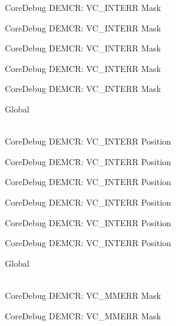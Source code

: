 \begin{DoxyRefList}
\label{deprecated__deprecated000202}%
%
Core\+Debug DEMCR\+: VC\+\_\+\+INTERR Mask 

\label{deprecated__deprecated000344}%
%
Core\+Debug DEMCR\+: VC\+\_\+\+INTERR Mask 

\label{deprecated__deprecated000420}%
%
Core\+Debug DEMCR\+: VC\+\_\+\+INTERR Mask 

\label{deprecated__deprecated000509}%
%
Core\+Debug DEMCR\+: VC\+\_\+\+INTERR Mask 

\label{deprecated__deprecated000611}%
%
Core\+Debug DEMCR\+: VC\+\_\+\+INTERR Mask  
\item[{\parbox[t]{\linewidth}{Global \doxylink{group___c_m_s_i_s___core_debug_ga22079a6e436f23b90308be97e19cf07e}{Core\+Debug\+\_\+\+DEMCR\+\_\+\+VC\+\_\+\+INTERR\+\_\+\+Pos} }}]\hfill \\
\label{deprecated__deprecated000057}%
%
Core\+Debug DEMCR\+: VC\+\_\+\+INTERR Position 

\label{deprecated__deprecated000201}%
%
Core\+Debug DEMCR\+: VC\+\_\+\+INTERR Position 

\label{deprecated__deprecated000343}%
%
Core\+Debug DEMCR\+: VC\+\_\+\+INTERR Position 

\label{deprecated__deprecated000419}%
%
Core\+Debug DEMCR\+: VC\+\_\+\+INTERR Position 

\label{deprecated__deprecated000508}%
%
Core\+Debug DEMCR\+: VC\+\_\+\+INTERR Position 

\label{deprecated__deprecated000610}%
%
Core\+Debug DEMCR\+: VC\+\_\+\+INTERR Position  
\item[{\parbox[t]{\linewidth}{Global \doxylink{group___c_m_s_i_s___core_debug_gad420a9b60620584faaca6289e83d3a87}{Core\+Debug\+\_\+\+DEMCR\+\_\+\+VC\+\_\+\+MMERR\+\_\+\+Msk} }}]\hfill \\
\label{deprecated__deprecated000068}%
%
Core\+Debug DEMCR\+: VC\+\_\+\+MMERR Mask 

\label{deprecated__deprecated000212}%
%
Core\+Debug DEMCR\+: VC\+\_\+\+MMERR Mask 


\end{DoxyRefList}
